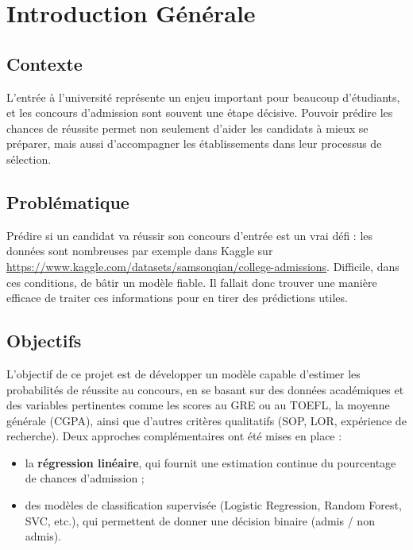 \chapter*{Introduction Générale}

\section{Contexte}

L’entrée à l’université représente un enjeu important pour beaucoup d’étudiants, et les concours d’admission sont souvent une étape décisive. Pouvoir prédire les chances de réussite permet non seulement d’aider les candidats à mieux se préparer, mais aussi d’accompagner les établissements dans leur processus de sélection.

\section{Problématique}

Prédire si un candidat va réussir son concours d’entrée est un vrai défi : les données sont nombreuses par exemple dans Kaggle sur \url{https://www.kaggle.com/datasets/samsonqian/college-admissions}. Difficile, dans ces conditions, de bâtir un modèle fiable. Il fallait donc trouver une manière efficace de traiter ces informations pour en tirer des prédictions utiles.

\section{Objectifs}

L’objectif de ce projet est de développer un modèle capable d’estimer les probabilités de réussite au concours, en se basant sur des données académiques et des variables pertinentes comme les scores au GRE ou au TOEFL, la moyenne générale (CGPA), ainsi que d’autres critères qualitatifs (SOP, LOR, expérience de recherche).  
Deux approches complémentaires ont été mises en place :  
\begin{itemize}
	\item la \textbf{régression linéaire}, qui fournit une estimation continue du pourcentage de chances d’admission ;
	\item des modèles de classification supervisée (Logistic Regression, Random Forest, SVC, etc.), qui permettent de donner une décision binaire (admis / non admis).
\end{itemize}

